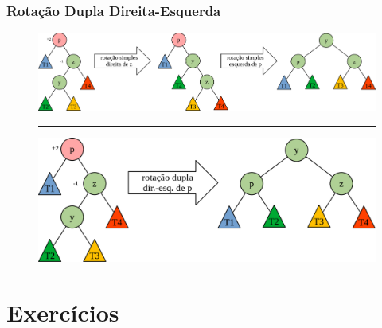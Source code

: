 \documentclass[aspectratio=169]{beamer}
\begin{document}
\begin{frame}[fragile]\frametitle{Rotação Dupla Direita-Esquerda}
\begin{figure}[h]
	\centering
	\includegraphics[height=0.33\paperheight]{imagens/rot_dup_dir_esq0.png}
	\vspace{3mm}
	\hrule
	\vspace{3mm}
	\includegraphics[height=0.33\paperheight]{imagens/rot_dup_dir_esq.png}
\end{figure}
\end{frame}

\section{Exercícios}
\end{document}
